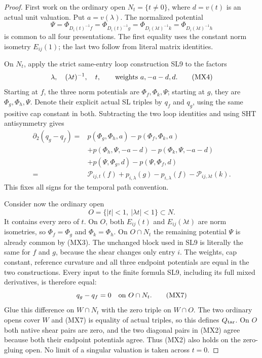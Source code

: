 \begin{proof}
First work on the ordinary open $N_t=\{t\ne0\}$, where
$d=v(t)$ is an actual unit valuation.  Put $a=v(\lambda)$.
The normalized potential
\[
 \Psi=\Phi_{D_i(t)^{-1}f}
       =\Phi_{D_i(t)^{-1}g}
       =\Phi_{D_i(\lambda t)^{-1}k}
       =\Phi_{D_i(\lambda t)^{-1}h}                            \tag{MX3}
\]
is common to all four presentations.  The first equality
uses the constant norm isometry $E_{ij}(1)$; the last two
follow from literal matrix identities.

On $N_t$, apply the strict same-entry loop construction SL9
to the factors
\[
                  \lambda,\quad(\lambda t)^{-1},\quad t,
                     \qquad\hbox{weights }a,-a-d,d.            \tag{MX4}
\]
Starting at $f$, the three norm potentials are
$\Phi_f,\Phi_k,\Psi$; starting at $g$, they are
$\Phi_g,\Phi_h,\Psi$.  Denote their explicit actual SL
triples by $q_f$ and $q_g$, using the same positive cap
constant in both.  Subtracting the two loop identities
and using SHT antisymmetry gives
\[
\begin{split}
 \partial_2(q_g-q_f)
   ={}&p(\Phi_g,\Phi_h,a)-p(\Phi_f,\Phi_k,a)\\
      &+p(\Phi_h,\Psi,-a-d)-p(\Phi_k,\Psi,-a-d)\\
      &+p(\Psi,\Phi_g,d)-p(\Psi,\Phi_f,d)\\
   ={}&\mathcal P_{ij,t}(f)+p_{i,\lambda}(g)
          -p_{i,\lambda}(f)-\mathcal P_{ij,\lambda t}(k).
\end{split}                                                    \tag{MX5}
\]
This fixes all signs for the temporal path convention.

Consider now the ordinary open
\[
                 O=\{|t|<1,\ |\lambda t|<1\}\subset N.          \tag{MX6}
\]
It contains every zero of $t$.  On $O$, both $E_{ij}(t)$
and $E_{ij}(\lambda t)$ are norm isometries, so
$\Phi_f=\Phi_g$ and $\Phi_k=\Phi_h$.  On $O\cap N_t$
the remaining potential $\Psi$ is already common by (MX3).
The unchanged block used in SL9 is literally the same
for $f$ and $g$, because the shear changes only entry $i$.
The weights, cap constant, reference curvature and all
three endpoint potentials are equal in the two constructions.
Every input to the finite formula SL9, including its full
mixed derivatives, is therefore equal:
\[
                             q_g-q_f=0\quad\hbox{on }O\cap N_t.
                                                               \tag{MX7}
\]
Glue this difference on $W\cap N_t$ with the zero triple on
$W\cap O$.  The two ordinary opens cover $W$ and (MX7)
is equality of actual triples, so this defines $Q_{\rm tar}$.
On $O$ both native shear pairs are zero, and the two diagonal
pairs in (MX2) agree because both their endpoint potentials
agree.  Thus (MX2) also holds on the zero-gluing open.
No limit of a singular valuation is taken across $t=0$.
\end{proof}

